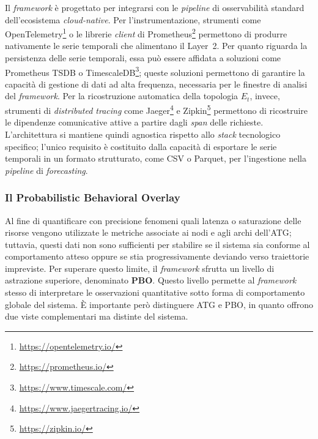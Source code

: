 Il \textit{framework} è progettato per integrarsi con le \textit{pipeline} di osservabilità
standard dell'ecosistema \textit{cloud-native}. Per l'instrumentazione, strumenti come
OpenTelemetry\footnote{\url{https://opentelemetry.io/}} o le librerie \textit{client} di
Prometheus\footnote{\url{https://prometheus.io/}} permettono di produrre nativamente le serie
temporali che alimentano il Layer~2.
Per quanto riguarda la persistenza delle serie temporali, essa può essere affidata a soluzioni
come Prometheus TSDB o TimescaleDB\footnote{\url{https://www.timescale.com/}}; queste soluzioni
permettono di garantire la capacità di gestione di dati ad alta frequenza, necessaria per le
finestre di analisi del \textit{framework}. Per la ricostruzione automatica della topologia $E_t$,
invece, strumenti di \textit{distributed tracing} come Jaeger\footnote{\url{https://www.jaegertracing.io/}}
e Zipkin\footnote{\url{https://zipkin.io/}} permettono di ricostruire le dipendenze comunicative
attive a partire dagli \textit{span} delle richieste.\\
L'architettura si mantiene quindi agnostica rispetto allo \textit{stack} tecnologico specifico;
l'unico requisito è costituito dalla capacità di esportare le serie temporali in un formato
strutturato, come CSV o Parquet, per l'ingestione nella \textit{pipeline} di \textit{forecasting}.

\subsubsection{Il Probabilistic Behavioral Overlay}
\label{sec:pbo}

Al fine di quantificare con precisione fenomeni quali latenza o saturazione delle risorse vengono
utilizzate le metriche associate ai nodi e agli archi dell'\gls{ATG}; tuttavia, questi dati non
sono sufficienti per stabilire se il sistema sia conforme al comportamento atteso oppure se stia
progressivamente deviando verso traiettorie impreviste. Per superare questo limite, il
\textit{framework} sfrutta un livello di astrazione superiore, denominato \textbf{\gls{PBO}}.
Questo livello permette al \textit{framework} stesso di interpretare le osservazioni quantitative
sotto forma di comportamento globale del sistema. È importante però distinguere \gls{ATG} e
\gls{PBO}, in quanto offrono due viste complementari ma distinte del sistema.

